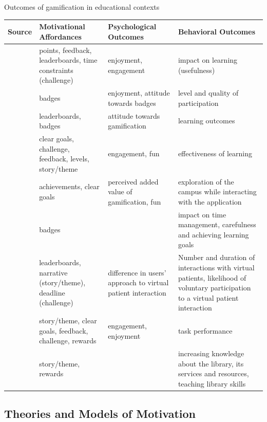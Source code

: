 \begin{quadro}[htb]
\caption{Outcomes of gamification in educational contexts}
\label{qua:outcomes-gamification-education}
\centering
\footnotesize
\begin{tabular}{|p{3cm}|p{3.5cm}|p{3.5cm}|p{3.5cm}|} \hline
\textbf{Source} & \textbf{Motivational Affordances} & \textbf{Psychological Outcomes} & \textbf{Behavioral Outcomes} \\ \hline \hline
\cite{CheongCheongFilippou2013} & points, feedback, leaderboards, time constraints (challenge) & enjoyment, engagement & impact on learning (usefulness) \\ \hline
\cite{Denny2013} & badges & enjoyment, attitude towards badges & level and quality of participation \\ \hline
\cite{DominguezSaenz-de-Navarretede-MarcosFernandez-SanzPagesMartinez-Herraiz2013} & leaderboards, badges & attitude towards gamification & learning outcomes \\ \hline
\cite{DongDontchevaJosephKarahaliosNewmanAckerman2012} & clear goals, challenge, feedback, levels, story/theme & engagement, fun & effectiveness of learning \\ \hline
\cite{Fitz-WalterTjondronegoroWyeth2011} & achievements, clear goals & perceived added value of gamification, fun & exploration of the campus while interacting with the application \\ \hline
\cite{HakulinenAuvinenKorhonen2013} & badges & & impact on time management, carefulness and achieving learning goals \\ \hline
\cite{HalanRossenCendanLok2010} & leaderboards, narrative (story/theme), deadline (challenge) & difference in users' approach to virtual patient interaction & Number and duration of interactions with virtual patients, likelihood of voluntary participation to a virtual patient interaction \\ \hline
\cite{LiGrossmanFitzmaurice2012} & story/theme, clear goals, feedback, challenge, rewards & engagement, enjoyment & task performance \\ \hline
\cite{SmithBaker2011} & story/theme, rewards & & increasing knowledge about the library, its services and resources, teaching library skills \\ \hline
\end{tabular}
\end{quadro}

\subsection{Theories and Models of Motivation}
\label{subsec:theories-motivation}

